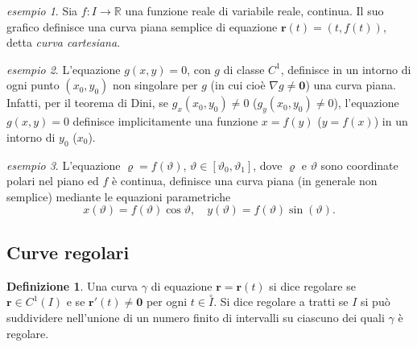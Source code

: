 \documentclass[a4paper]{book}
\numberwithin{equation}{section}
\renewcommand{\theta}{\vartheta}
\renewcommand{\rho}{\varrho}
\theoremstyle{plain}
\theoremstyle{definition}
\newtheorem{defn}{Definizione}[section]
\theoremstyle{remark}
\renewcommand{\vec}{\boldsymbol}
\theoremstyle{example}
\newtheorem{exmp}{esempio}[section]
\begin{document}
\begin{exmp}
	Sia $f \colon I \to \mathbb{R}$ una funzione reale di variabile reale, continua. Il suo grafico definisce una curva piana semplice di equazione $\vec{r}(t) = (t, f(t))$, detta \emph{curva cartesiana}.
\end{exmp}

\begin{exmp}
	L'equazione $g(x, y) = 0$, con $g$ di classe $C^1$, definisce in un intorno di ogni punto $(x_0, y_0)$ non singolare per $g$ (in cui cioè $\nabla g \ne \vec{0}$) una curva piana. Infatti, per il teorema di Dini, se $g_x(x_0, y_0) \ne 0$ ($g_y(x_0, y_0) \ne 0$), l'equazione $g(x, y) = 0$ definisce implicitamente una funzione $x = f(y)$ ($y = f(x)$) in un intorno di $y_0$ ($x_0$).
\end{exmp}

\begin{exmp}
	L'equazione $\rho = f(\theta)$, $\theta \in [\theta_0, \theta_1]$, dove $\rho$ e $\theta$ sono coordinate polari nel piano ed $f$ è continua, definisce una curva piana (in generale non semplice) mediante le equazioni parametriche
	\begin{equation*}
		x(\theta) = f(\theta)\cos\theta, \quad y(\theta) = f(\theta)\sin(\theta).
	\end{equation*}
\end{exmp}

\subsection{Curve regolari}
\begin{defn}
	Una curva $\gamma$ di equazione $\vec{r} = \vec{r}(t)$ si dice regolare se $\vec{r} \in C^1(I)$ e se $\vec{r}'(t) \ne \vec{0}$ per ogni $t \in \overset{\circ}{I}$. Si dice regolare a tratti se $I$ si può suddividere nell'unione di un numero finito di intervalli su ciascuno dei quali $\gamma$ è regolare.
\end{defn}
\end{document}
